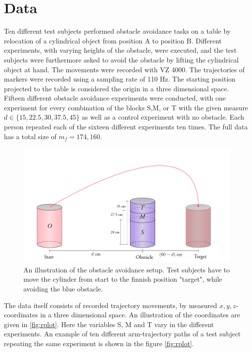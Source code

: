 \documentclass[11pt, fleqn, titlepage]{article}
\begin{document}
\section{Data}
Ten different test subjects performed obstacle avoidance tasks on a table by relocation of a cylindrical object from position A to position B. Different experiments, with varying heights of the obstacle, were executed, and the test subjects were furthermore asked to avoid the obstacle by lifting the cylindrical object at hand. The movements were recorded with VZ 4000. The trajectories of markers were recorded using a sampling rate of 110 Hz. The starting position projected to the table is considered the origin in a three dimensional space. Fifteen different obstacle avoidance experiments were conducted, with one experiment for every combination of the blocks S,M, or T with the given measure $ d \in \{15, 22.5,  30, 37.5, 45\} $ as well as a control experiment with no obstacle. Each person repeated each of the sixteen different experiments ten times. The full data has a total size of $ m_f = 174,160 $. \cite{armdata}
\begin{figure}[H]
	\centering
	\includegraphics[width=0.5\linewidth]{billeder/exp_pic.png}
	\caption{An illustration of the obstacle avoidance setup. Test subjects have to move the cylinder from start to the finnish position "target", while avoiding the blue obstacle.}
	\label{fig:exppic}
\end{figure}
The data itself consists of recorded trajectory movements, by measured $ x,y,z $-coordinates in a three dimensional space. An illustration of the coordinates are given in \ref{fig:rplot}. Here the variables S, M and T vary in the different experiments. An example of ten different arm-trajectory paths of a test subject repeating the same experiment is shown in the figure \ref{fig:rplot}.
\end{document}
